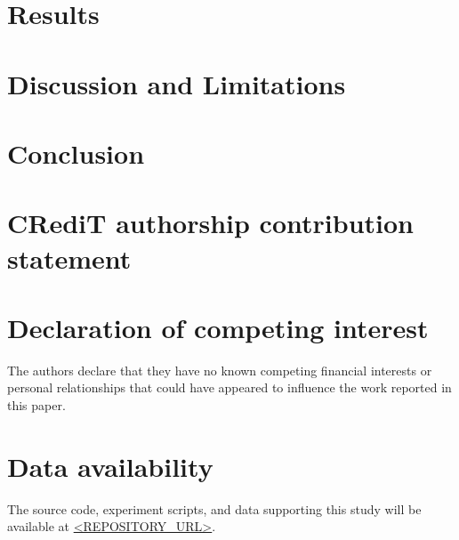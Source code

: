 \documentclass[a4paper,fleqn]{cas-sc}
\begin{document}
\section{Results}

\section{Discussion and Limitations}

\section{Conclusion}

\section*{CRediT authorship contribution statement}

\section*{Declaration of competing interest}
The authors declare that they have no known competing financial interests or personal relationships that could have appeared to influence the work reported in this paper.

\section*{Data availability}
The source code, experiment scripts, and data supporting this study will be available at \url{<REPOSITORY_URL>}.



\end{document}
